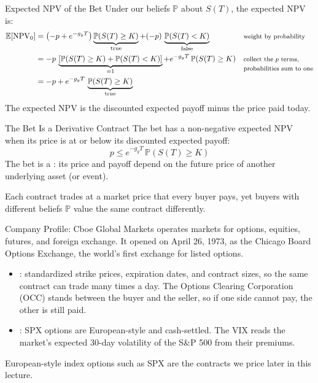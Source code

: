 \documentclass[aspectratio=169,11pt]{beamer}
\newcommand{\E}{\mathbb{E}}
\newcommand{\ST}{S(T)}
\begin{document}
\begin{frame}{Expected NPV of the Bet}
  Under our beliefs $\mathbb{P}$ about $\ST$, the expected NPV is:
  {\small
  \[
    \begin{aligned}
      \E[\operatorname{NPV}_0]&=\left(-p+e^{-g_yT}\right)\underbrace{\mathbb{P}(\ST\ge K)}_{\text{true}}+(-p)\,\underbrace{\mathbb{P}(\ST<K)}_{\text{false}} &&\text{\footnotesize weight by probability}\\
      &=-p\,\underbrace{\left[\mathbb{P}(\ST\ge K)+\mathbb{P}(\ST<K)\right]}_{=1}+e^{-g_yT}\,\mathbb{P}(\ST\ge K) &&\begin{tabular}[t]{@{}l@{}}\footnotesize collect the $p$ terms,\\ \footnotesize probabilities sum to one\end{tabular}\\
      &=-p+e^{-g_yT}\,\underbrace{\mathbb{P}(\ST\ge K)}_{\text{true}}
    \end{aligned}
  \]
  }%
  The expected NPV is the discounted expected payoff minus the price paid
  today.
\end{frame}

\begin{frame}{The Bet Is a Derivative Contract}
  The bet has a non-negative expected NPV when its price is at or below its
  discounted expected payoff:
  \[
    p\le e^{-g_yT}\,\mathbb{P}(\ST\ge K)
  \]
  The bet is a : its price and payoff depend on the
  future price of another underlying asset (or event).

  \vspace{0.6em}
  Each contract trades at a market price that every buyer pays, yet buyers with
  different beliefs $\mathbb{P}$ value the same contract differently.

  \vspace{0.6em}
  \textbf{}
\end{frame}

\begin{frame}{Company Profile: Cboe Global Markets}
  \href{https://www.cboe.com/}{} operates markets for options,
  equities, futures, and foreign exchange. It opened on April 26, 1973, as the
  Chicago Board Options Exchange, the world's first exchange for listed options.
  \begin{itemize}\setlength{\itemsep}{0.5em}
    \item {}: standardized strike prices, expiration dates,
      and contract sizes, so the same contract can trade many times a day. The
      Options Clearing Corporation (OCC) stands between the buyer and the seller,
      so if one side cannot pay, the other is still paid.
    \item {}: SPX options are European-style
      and cash-settled. The VIX reads the market's expected 30-day volatility of
      the S\&P 500 from their premiums.
  \end{itemize}
  \vspace{0.3em}
  European-style index options such as SPX are the contracts we price later in
  this lecture.
\end{frame}
\end{document}

